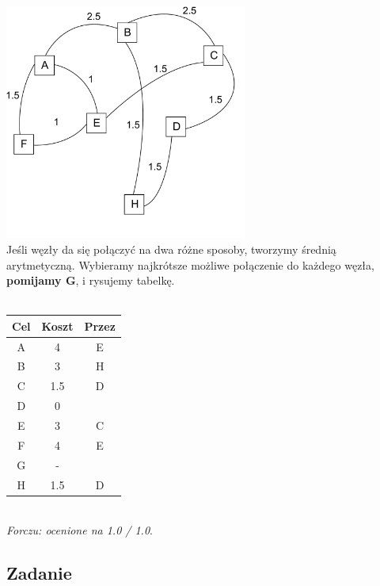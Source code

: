 				\includegraphics[width=8.0cm]{./images/zadanie06.pdf}\\
			Jeśli węzły da się połączyć na dwa różne sposoby, tworzymy średnią arytmetyczną. Wybieramy najkrótsze możliwe połączenie do każdego węzła, \textbf{pomijamy G}, i rysujemy tabelkę.\\\\ 
			\begin{tabular}{c|c|c}
				Cel & Koszt & Przez \\ \hline
				A   & 4     & E     \\
				B   & 3     & H     \\
				C   & 1.5   & D     \\
				D   & 0     &       \\
				E   & 3     & C     \\
				F   & 4     & E     \\
				G   & -     &       \\
				H   & 1.5   & D     
			\end{tabular}\\
			\small{ \emph{Forczu: ocenione na 1.0 / 1.0}}.
	\subsection{Zadanie}
